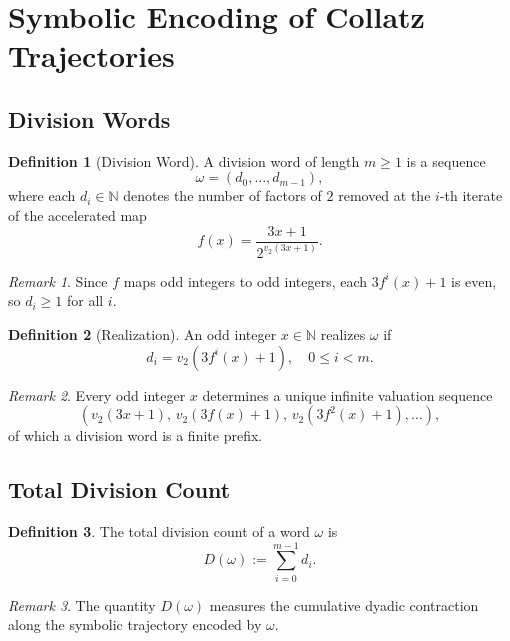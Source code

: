 \documentclass[12pt, oneside]{article}
\numberwithin{equation}{section}
\theoremstyle{definition}
\newtheorem{definition}{Definition}[section]
\theoremstyle{plain}
\theoremstyle{remark}
\newtheorem*{remark}{Remark}
\begin{document}
\section{Symbolic Encoding of Collatz Trajectories}
\label{sec:division-counts}

\subsection{Division Words}

\begin{definition}[Division Word]
A division word of length $m \ge 1$ is a sequence
\[
\omega = (d_0, \dots, d_{m-1}),
\]
where each $d_i \in \mathbb{N}$ denotes the number of factors of \(2\)
removed at the $i$-th iterate of the accelerated map
\[
f(x) = \frac{3x+1}{2^{v_2(3x+1)}}.
\]
\end{definition}

\begin{remark}
Since $f$ maps odd integers to odd integers, each $3f^i(x)+1$ is even,
so $d_i \ge 1$ for all $i$.
\end{remark}

\begin{definition}[Realization]
An odd integer $x \in \mathbb{N}$ realizes $\omega$ if
\[
d_i = v_2(3f^i(x)+1), \quad 0 \le i < m.
\]
\end{definition}

\begin{remark}
Every odd integer \(x\) determines a unique infinite valuation sequence
\[
(v_2(3x+1),\, v_2(3f(x)+1),\, v_2(3f^2(x)+1),\dots),
\]
of which a division word is a finite prefix.
\end{remark}

\subsection{Total Division Count}

\begin{definition}
The total division count of a word $\omega$ is
\[
D(\omega) := \sum_{i=0}^{m-1} d_i.
\]
\end{definition}

\begin{remark}
The quantity \(D(\omega)\) measures the cumulative dyadic contraction
along the symbolic trajectory encoded by \(\omega\).
\end{remark}
\end{document}
